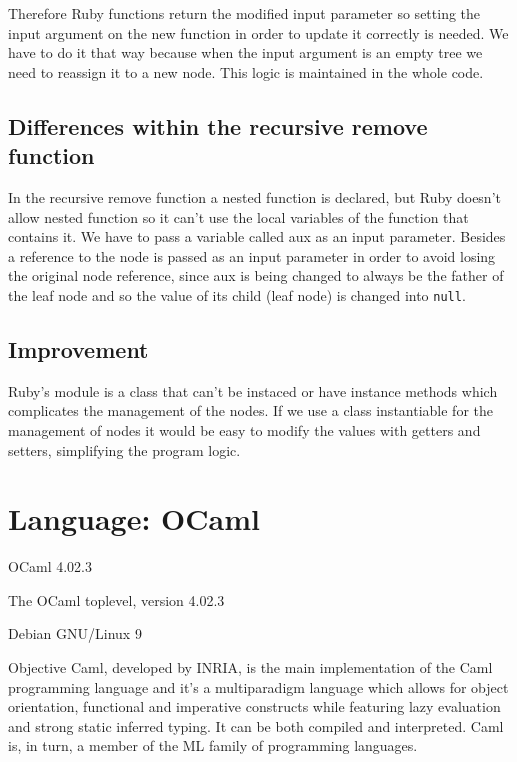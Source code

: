 \documentclass[11pt]{scrartcl} %
\begin{document}
	Therefore Ruby functions return the modified input parameter so setting the input argument on the new function in order to update it correctly is needed.
	We have to do it that way because when the input argument is an empty tree we need to reassign it to a new node. This logic is maintained in the whole code.
	
\subsection*{Differences within the recursive remove function}

In the recursive remove function a nested function is declared, but Ruby doesn't allow nested function so it can't use the local variables of the function that contains it. We have to pass a variable called aux as an input parameter. Besides a reference to the node is passed as an input parameter in order to avoid losing the original node reference, since aux is being changed to always be the father of the leaf node and so the value of its child (leaf node) is changed into \texttt{null}.
 
\subsection*{Improvement}

Ruby's module is a class that can't be instaced or have instance methods which complicates the management of the nodes. If we use a class instantiable for the management of nodes it would be easy to modify the values with getters and setters, simplifying the program logic.

\section{Language: OCaml}

\begin{description}[align=left,labelwidth=10em]
\item [Language Version] OCaml 4.02.3
\item [Interpreter] The OCaml toplevel, version 4.02.3
\item [Operating System] Debian GNU/Linux 9
\end{description}

Objective Caml, developed by INRIA, is the main implementation of the Caml programming language and it's a multiparadigm language which allows for object orientation, functional and imperative constructs while featuring lazy evaluation and strong static inferred typing. It can be both compiled and interpreted. Caml is, in turn, a member of the ML family of programming languages.
\end{document}

